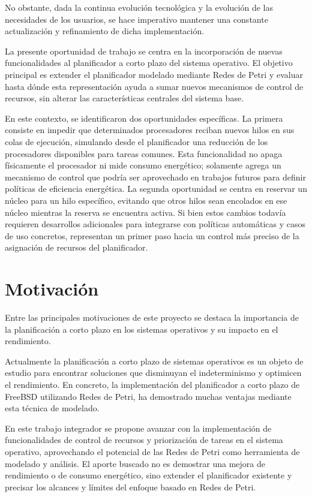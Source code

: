No obstante, dada la continua evolución tecnológica y la evolución de las necesidades de los usuarios, se hace imperativo mantener una constante actualización y refinamiento de dicha implementación.\par

La presente oportunidad de trabajo se centra en la incorporación de nuevas funcionalidades al planificador a corto plazo del sistema operativo. El objetivo principal es extender el planificador modelado mediante Redes de Petri y evaluar hasta dónde esta representación ayuda a sumar nuevos mecanismos de control de recursos, sin alterar las características centrales del sistema base.\par

En este contexto, se identificaron dos oportunidades específicas. La primera consiste en impedir que determinados procesadores reciban nuevos hilos en sus colas de ejecución, simulando desde el planificador una reducción de los procesadores disponibles para tareas comunes. Esta funcionalidad no apaga físicamente el procesador ni mide consumo energético; solamente agrega un mecanismo de control que podría ser aprovechado en trabajos futuros para definir políticas de eficiencia energética. La segunda oportunidad se centra en reservar un núcleo para un hilo específico, evitando que otros hilos sean encolados en ese núcleo mientras la reserva se encuentra activa. Si bien estos cambios todavía requieren desarrollos adicionales para integrarse con políticas automáticas y casos de uso concretos, representan un primer paso hacia un control más preciso de la asignación de recursos del planificador.\par

\section{Motivación}
Entre las principales motivaciones de este proyecto se destaca la importancia de la planificación a corto plazo en los sistemas operativos y su impacto en el rendimiento.

Actualmente la planificación a corto plazo de sistemas operativos es un objeto de estudio para encontrar soluciones que disminuyan el indeterminismo y optimicen el rendimiento. En concreto, la implementación del planificador a corto plazo de FreeBSD utilizando Redes de Petri, ha demostrado muchas ventajas mediante esta técnica de modelado.\par

En este trabajo integrador se propone avanzar con la implementación de funcionalidades de control de recursos y priorización de tareas en el sistema operativo, aprovechando el potencial de las Redes de Petri como herramienta de modelado y análisis. El aporte buscado no es demostrar una mejora de rendimiento o de consumo energético, sino extender el planificador existente y precisar los alcances y límites del enfoque basado en Redes de Petri.\par

